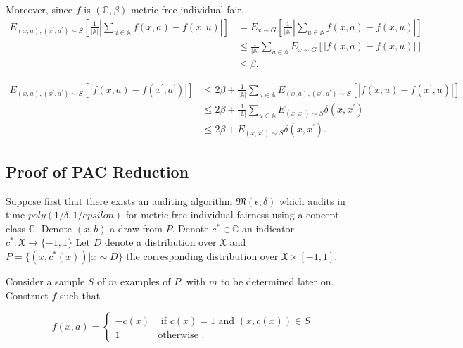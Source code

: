 \documentclass{article}
\begin{document}
Moreover, since $f$ is $(\mathbb{C}, \beta)$-metric free individual fair,
\begin{equation}
\begin{split}
    E_{(x,a), (x^{'}, a^{'})\sim S}\left[\frac{1}{|\mathbb{A}|}\left|\displaystyle\sum_{u\in \mathbb{A}} f(x,a) - f(x,u)\right|\right] &= E_{x\sim G}\left[\frac{1}{|\mathbb{A}|}\left|\displaystyle\sum_{u\in \mathbb{A}} f(x,a) - f(x,u)\right|\right] \\
    & \leq \frac{1}{|\mathbb{A}|}\displaystyle\sum_{u\in \mathbb{A}} E_{x\sim G} \left[\left |f(x,a) - f(x,u)\right|\right] \\
    & \leq \beta.
    \end{split}
\end{equation}

\begin{equation}
\begin{split}
    E_{(x,a), (x^{'}, a^{'})\sim S}\left[|f(x,a) -f(x^{'}, a^{'})|\right]&\leq 2\beta +  \frac{1}{|\mathbb{A}|}\displaystyle\sum_{u\in \mathbb{A}}E_{(x,a), (x^{'}, a^{'})\sim S}\left[\left|  f(x,u) - f(x^{'},u)\right|\right]\\
    & \leq 2\beta + \frac{1}{|\mathbb{A}|}\displaystyle\sum_{u\in \mathbb{A}}E_{(x, x^{'})\sim S}\delta(x, x^{'}) \\
    & \leq 2\beta + E_{(x, x^{'})\sim S}\delta(x, x^{'}).
    \end{split}
\end{equation}

\subsection{Proof of PAC Reduction}

Suppose first that there exists an auditing algorithm $\mathfrak{M}(\epsilon, \delta)$ which audits in time $poly(1/\delta, 1/epsilon)$ for metric-free individual fairness using a concept class $\mathbb{C}$. Denote $(x, b)$ a draw from $P$. Denote $c^{*}\in \mathbb{C}$ an indicator $c^{*}: \mathfrak{X} \rightarrow \{-1,1\}$ Let $D$ denote a distribution over $\mathfrak{X}$ and $P=\{(x, c^{*}(x))| x\sim D\}$ the corresponding distribution over $\mathfrak{X}\times [-1,1]$. 

\bigskip
Consider a sample $S$ of $m$ examples of $P$, with $m$ to be determined later on. Construct $f$ such that

\begin{equation}
    f(x, a) = \begin{cases}
    -c(x) & \mbox{ if } c(x)=1 \mbox{ and } (x, c(x))\in S  \\
    1 & \mbox{otherwise }.
    \end{cases}
\end{equation}
\end{document}
